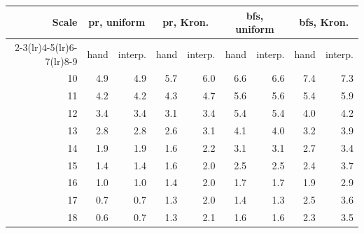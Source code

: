 \begin{tabular}{rrrrrrrrr}
\toprule
Scale & \multicolumn{2}{c}{pr, uniform} & \multicolumn{2}{c}{pr, Kron.} & \multicolumn{2}{c}{bfs, uniform} & \multicolumn{2}{c}{bfs, Kron.} \\
\cmidrule(lr){2-3}\cmidrule(lr){4-5}\cmidrule(lr){6-7}\cmidrule(lr){8-9}
 & hand & interp. & hand & interp. & hand & interp. & hand & interp. \\
\midrule
10 & 4.9 & 4.9 & 5.7 & 6.0 & 6.6 & 6.6 & 7.4 & 7.3 \\
11 & 4.2 & 4.2 & 4.3 & 4.7 & 5.6 & 5.6 & 5.4 & 5.9 \\
12 & 3.4 & 3.4 & 3.1 & 3.4 & 5.4 & 5.4 & 4.0 & 4.2 \\
13 & 2.8 & 2.8 & 2.6 & 3.1 & 4.1 & 4.0 & 3.2 & 3.9 \\
14 & 1.9 & 1.9 & 1.6 & 2.2 & 3.1 & 3.1 & 2.7 & 3.4 \\
15 & 1.4 & 1.4 & 1.6 & 2.0 & 2.5 & 2.5 & 2.4 & 3.7 \\
16 & 1.0 & 1.0 & 1.4 & 2.0 & 1.7 & 1.7 & 1.9 & 2.9 \\
17 & 0.7 & 0.7 & 1.3 & 2.0 & 1.4 & 1.3 & 2.5 & 3.6 \\
18 & 0.6 & 0.7 & 1.3 & 2.1 & 1.6 & 1.6 & 2.3 & 3.5 \\
\bottomrule
\end{tabular}
